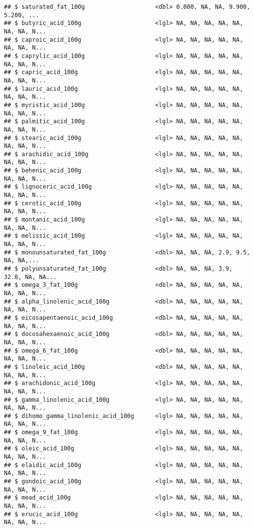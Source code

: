 \documentclass[]{article}
\begin{document}
\begin{verbatim}
## $ saturated_fat_100g                    <dbl> 0.000, NA, NA, 9.900, 5.200, ...
## $ butyric_acid_100g                     <lgl> NA, NA, NA, NA, NA, NA, NA, N...
## $ caproic_acid_100g                     <lgl> NA, NA, NA, NA, NA, NA, NA, N...
## $ caprylic_acid_100g                    <lgl> NA, NA, NA, NA, NA, NA, NA, N...
## $ capric_acid_100g                      <lgl> NA, NA, NA, NA, NA, NA, NA, N...
## $ lauric_acid_100g                      <lgl> NA, NA, NA, NA, NA, NA, NA, N...
## $ myristic_acid_100g                    <lgl> NA, NA, NA, NA, NA, NA, NA, N...
## $ palmitic_acid_100g                    <lgl> NA, NA, NA, NA, NA, NA, NA, N...
## $ stearic_acid_100g                     <lgl> NA, NA, NA, NA, NA, NA, NA, N...
## $ arachidic_acid_100g                   <lgl> NA, NA, NA, NA, NA, NA, NA, N...
## $ behenic_acid_100g                     <lgl> NA, NA, NA, NA, NA, NA, NA, N...
## $ lignoceric_acid_100g                  <lgl> NA, NA, NA, NA, NA, NA, NA, N...
## $ cerotic_acid_100g                     <lgl> NA, NA, NA, NA, NA, NA, NA, N...
## $ montanic_acid_100g                    <lgl> NA, NA, NA, NA, NA, NA, NA, N...
## $ melissic_acid_100g                    <lgl> NA, NA, NA, NA, NA, NA, NA, N...
## $ monounsaturated_fat_100g              <dbl> NA, NA, NA, 2.9, 9.5, NA, NA,...
## $ polyunsaturated_fat_100g              <dbl> NA, NA, NA, 3.9, 32.8, NA, NA...
## $ omega_3_fat_100g                      <dbl> NA, NA, NA, NA, NA, NA, NA, N...
## $ alpha_linolenic_acid_100g             <dbl> NA, NA, NA, NA, NA, NA, NA, N...
## $ eicosapentaenoic_acid_100g            <dbl> NA, NA, NA, NA, NA, NA, NA, N...
## $ docosahexaenoic_acid_100g             <dbl> NA, NA, NA, NA, NA, NA, NA, N...
## $ omega_6_fat_100g                      <dbl> NA, NA, NA, NA, NA, NA, NA, N...
## $ linoleic_acid_100g                    <dbl> NA, NA, NA, NA, NA, NA, NA, N...
## $ arachidonic_acid_100g                 <lgl> NA, NA, NA, NA, NA, NA, NA, N...
## $ gamma_linolenic_acid_100g             <lgl> NA, NA, NA, NA, NA, NA, NA, N...
## $ dihomo_gamma_linolenic_acid_100g      <lgl> NA, NA, NA, NA, NA, NA, NA, N...
## $ omega_9_fat_100g                      <lgl> NA, NA, NA, NA, NA, NA, NA, N...
## $ oleic_acid_100g                       <lgl> NA, NA, NA, NA, NA, NA, NA, N...
## $ elaidic_acid_100g                     <lgl> NA, NA, NA, NA, NA, NA, NA, N...
## $ gondoic_acid_100g                     <lgl> NA, NA, NA, NA, NA, NA, NA, N...
## $ mead_acid_100g                        <lgl> NA, NA, NA, NA, NA, NA, NA, N...
## $ erucic_acid_100g                      <lgl> NA, NA, NA, NA, NA, NA, NA, N...

\end{verbatim}
\end{document}
